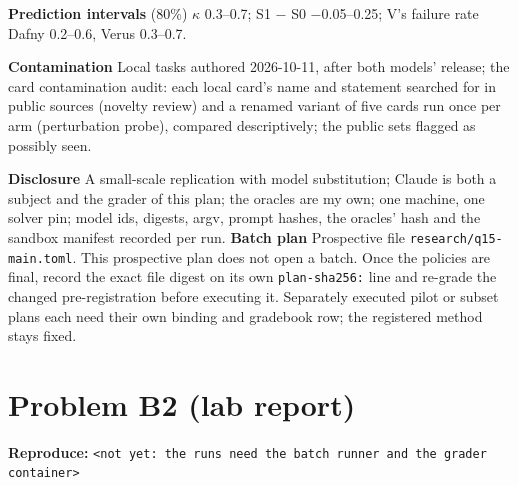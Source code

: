 \documentclass[11pt]{article}
\begin{document}
\begin{answer}
\textbf{Prediction intervals} (80\%) $\kappa$ 0.3--0.7; S1 $-$ S0 $-$0.05--0.25;
V's failure rate Dafny 0.2--0.6, Verus 0.3--0.7.

\textbf{Contamination} Local tasks authored 2026-10-11, after both models'
release; the card contamination audit: each local card's name and statement
searched for in public sources (novelty review) and a renamed variant of five
cards run once per arm (perturbation probe), compared descriptively; the
public sets flagged as possibly seen.

\textbf{Disclosure} A small-scale replication with model substitution; Claude is
both a subject and the grader of this plan; the oracles are my own; one
machine, one solver pin; model ids, digests, argv, prompt hashes, the oracles'
hash and the sandbox manifest recorded per run.
\textbf{Batch plan} Prospective file \texttt{research/q15-main.toml}.
This prospective plan does not open a batch. Once the policies are final,
record the exact file digest on its own \texttt{plan-sha256:} line and
re-grade the changed pre-registration before executing it. Separately
executed pilot or subset plans each need their own binding and gradebook
row; the registered method stays fixed.
\end{answer}

\section*{Problem B2 (lab report)}\label{ans:B2}
\begin{answer}
\textbf{Reproduce:} \verb+<not yet: the runs need the batch runner and the grader container>+
\end{answer}

\end{document}
